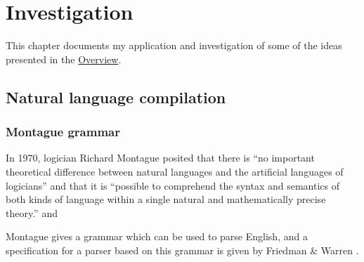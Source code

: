 \chapter{Investigation}
\label{chap:investigation}

This chapter documents my application and investigation of some of the ideas presented in the \hyperref[chap:overview]{Overview}.











\section{Natural language compilation}

\subsection{Montague grammar}
In 1970, logician Richard Montague posited that there is “no important theoretical difference between natural languages and the artificial languages of logicians” and that it is “possible to comprehend the syntax and semantics of both kinds of language within a single natural and mathematically precise theory.” \autocite{Montague1970_universal_grammar} and \autocite{Montague1970_english_formal}

Montague gives a grammar which can be used to parse English, and a specification for a parser based on this grammar is given by Friedman \& Warren \autocite{Friedman1978}.

